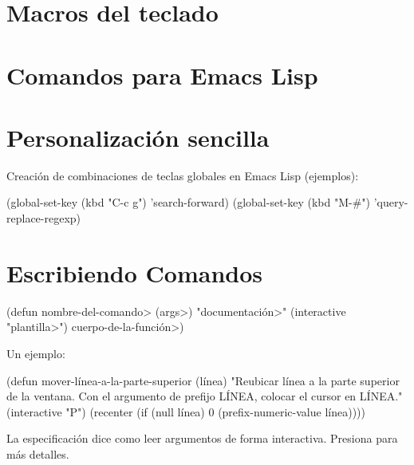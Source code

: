 
\section{Macros del teclado}


\copyrightnotice
\newcolumn
\section{Comandos para Emacs Lisp}


\section{Personalizaci{\'o}n sencilla}



Creaci{\'o}n de combinaciones de teclas globales en Emacs Lisp (ejemplos):

\beginexample%
(global-set-key (kbd "C-c g") 'search-forward)
(global-set-key (kbd "M-\#") 'query-replace-regexp)
\endexample

\section{Escribiendo Comandos}

\beginexample%
(defun \<nombre-del-comando> (\<args>)
  "\<documentaci{\'o}n>"
  (interactive "\<plantilla>")
  \<cuerpo-de-la-funci{\'o}n>)
\endexample

Un ejemplo:

\beginexample%
(defun mover-l{\'i}nea-a-la-parte-superior (l{\'i}nea)
  "Reubicar l{\'i}nea a la parte superior de la ventana.
Con el argumento de prefijo L{\'I}NEA,
colocar el cursor en L{\'I}NEA."
  (interactive "P")
  (recenter (if (null l{\'i}nea)
                0
              (prefix-numeric-value l{\'i}nea))))
\endexample

La especificaci{\'o}n  dice como leer argumentos de
forma interactiva.
Presiona  para m{\'a}s detalles.

\bye

